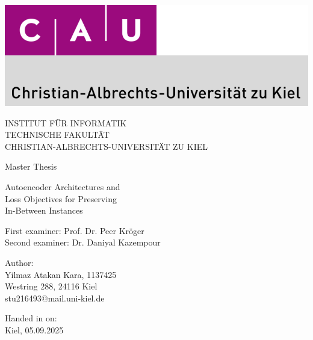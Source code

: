 \documentclass[
  11pt,            %
  a4paper,         %
  twoside,         %
]{report}
\begin{document}
\hypersetup{pageanchor=false} %
\thispagestyle{empty}
\includegraphics[width=\columnwidth]{images/cau-norm-de-lilagrey-rgb-0720.png}

\begin{center}
    \vspace{1.00cm}
    
    INSTITUT FÜR INFORMATIK \\
    TECHNISCHE FAKULTÄT \\
    CHRISTIAN-ALBRECHTS-UNIVERSITÄT ZU KIEL
    
    \vspace{2.00cm}
    
    {\huge Master Thesis}
    
    \vspace{2.00cm}
    
    {\Huge Autoencoder Architectures and \\ Loss Objectives for Preserving \\[0.5cm] In-Between Instances}
    
    \vspace{2.50cm}
    
    First examiner: Prof. Dr. Peer Kröger \\
    Second examiner: Dr. Daniyal Kazempour
    
    \vspace{1.00cm}
    
    Author: \\
    {Yilmaz Atakan Kara, 1137425} \\
    {Westring 288, 24116 Kiel} \\
    {stu216493@mail.uni-kiel.de}
    
    \vspace{1.00cm}

    Handed in on: \\
    Kiel, 05.09.2025
\end{center}
\end{document}
